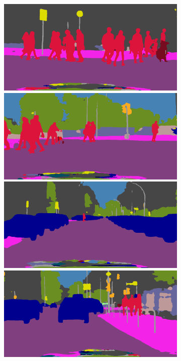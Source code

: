 \begin{figure}[p]
{{\begin{subfigure}[t]{0.24\linewidth}
\begin{center}
		\includegraphics[width=\linewidth,trim={0px 60px 0 0px},clip]{results/segnet_128_output_1.png}
		\includegraphics[width=\linewidth,trim={0px 60px 0 0px},clip]{results/segnet_114_output_1.png}
		\includegraphics[width=\linewidth,trim={0px 60px 0 0px},clip]{results/segnet_86_output_1.png}
		\includegraphics[width=\linewidth,trim={0px 60px 0 0px},clip]{results/segnet_51_output_1.png}

\end{center}
\end{subfigure}}}
\end{figure}
